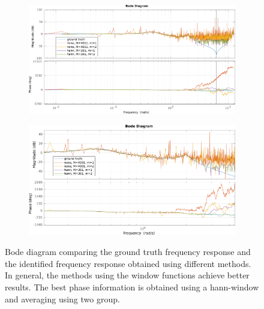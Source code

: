 \documentclass{scrartcl}
\newcommand*{\matlabcode}[3]{\begin{figure}[h!]\end{figure}}
\begin{document}
\matlabcode{../matlab/ce1/spectral_analysis.m}
{{Compute the frequency response of the system to be identified using the spectral analysis method. The function interface provides additional parameters for specifiying the (optional) window and the corresponding window-width. If no window parameters are given, no window is used.}}
{lst:resp_spec_ana}

\begin{figure}[h]
	\centering
	\begin{subfigure}{\textwidth}
		\includegraphics[width=\textwidth]{figures/bode_1_6_large.pdf}
	\end{subfigure}
	\begin{subfigure}{\textwidth}
		\includegraphics[width=\textwidth]{figures/bode_1_6.pdf}
	\end{subfigure}
	\caption{Bode diagram comparing the ground truth frequency response and the identified frequency response obtained using different methods. In general, the methods using the window functions achieve better results. The best phase information is obtained using a hann-window and averaging using two group.}
	\label{fig:bode_final}
\end{figure}
\end{document}
